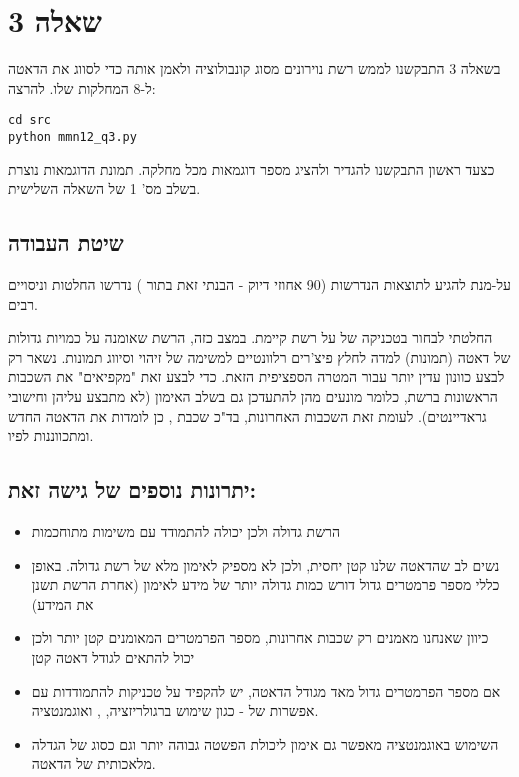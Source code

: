 \HE
\section*{שאלה {3}}
בשאלה 3 התבקשנו לממש רשת נוירונים מסוג קונבולוציה ולאמן אותה כדי לסווג את הדאטה ל-8 המחלקות שלו.\newline
להרצה:
\EN
\begin{framed}
\begin{verbatim}
cd src
python mmn12_q3.py
\end{verbatim}
\end{framed}
\HE

כצעד ראשון התבקשנו להגדיר  ולהציג מספר דוגמאות מכל מחלקה.
תמונת הדוגמאות נוצרת בשלב מס' 1 של השאלה השלישית. 
\newline

\subsection*{שיטת העבודה}
על-מנת להגיע לתוצאות הנדרשות (90 אחוזי דיוק - הבנתי זאת בתור ) נדרשו החלטות וניסויים רבים.

החלטתי לבחור בטכניקה של  על רשת קיימת.
במצב כזה, הרשת שאומנה על כמויות גדולות של דאטה (תמונות) למדה לחלץ פיצ'רים רלוונטיים למשימה של זיהוי וסיווג תמונות. נשאר רק לבצע כוונון עדין יותר עבור המטרה הספציפית הזאת.\newline
כדי לבצע זאת "מקפיאים" את השכבות הראשונות ברשת, כלומר מונעים מהן להתעדכן גם בשלב האימון (לא מתבצע עליהן  וחישובי גראדיינטים). לעומת זאת השכבות האחרונות, בד"כ שכבת , כן לומדות את הדאטה החדש ומתכווננות לפיו. \newline

\subsection*{יתרונות נוספים של גישה זאת:}
\begin{itemize}
    \item הרשת גדולה ולכן יכולה להתמודד עם משימות מתוחכמות
    \item נשים לב שהדאטה שלנו קטן יחסית, ולכן לא מספיק לאימון מלא של רשת גדולה. באופן כללי מספר פרמטרים גדול דורש כמות גדולה יותר של מידע לאימון (אחרת הרשת תשנן את המידע)
    \item כיוון שאנחנו מאמנים רק שכבות אחרונות, מספר הפרמטרים המאומנים קטן יותר ולכן יכול להתאים לגודל דאטה קטן
    \item אם מספר הפרמטרים גדול מאד מגודל הדאטה, יש להקפיד על טכניקות להתמודדות עם אפשרות של  - כגון שימוש ברגולריזציה, , ואוגמנטציה.
    \item השימוש באוגמנטציה מאפשר גם אימון ליכולת הפשטה גבוהה יותר וגם כסוג של הגדלה מלאכותית של הדאטה.
\end{itemize}

